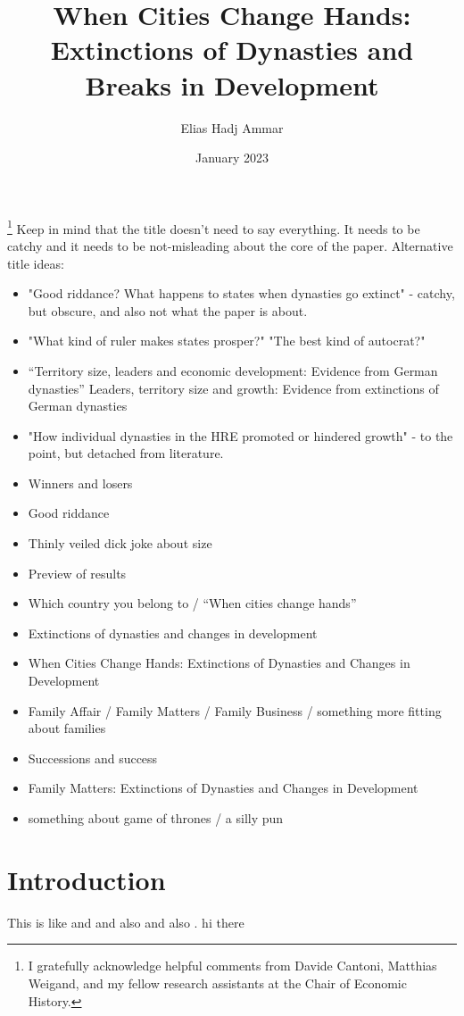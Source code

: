 \documentclass{article}
\title{When Cities Change Hands: Extinctions of Dynasties and \\Breaks in Development}
\author{Elias Hadj Ammar}
\date{January 2023}
\begin{document}
\maketitle
\footnote{I gratefully acknowledge helpful comments from Davide Cantoni, Matthias Weigand, and my fellow research assistants at the Chair of Economic History.}
Keep in mind that the title doesn't need to say everything. It needs to be catchy and it needs to be not-misleading about the core of the paper.
Alternative title ideas: 
\begin{itemize}
    \item "Good riddance? What happens to states when dynasties go extinct" - catchy, but obscure, and also not what the paper is about.
    \item "What kind of ruler makes states prosper?" "The best kind of autocrat?"
    \item ``Territory size, leaders and economic development: Evidence from German dynasties'' {Leaders, territory size and growth: Evidence from extinctions of German dynasties}

    \item "How individual dynasties in the HRE promoted or hindered growth" - to the point, but detached from literature.
    \item Winners and losers
    \item Good riddance
    \item Thinly veiled dick joke about size
    \item Preview of results
    \item Which country you belong to / ``When cities change hands''
    \item {Extinctions of dynasties and changes in development}
    \item {When Cities Change Hands: Extinctions of Dynasties and Changes in Development}
    \item Family Affair / Family Matters / Family Business / something more fitting about families
    \item Successions and success
    \item {Family Matters: Extinctions of Dynasties and Changes in Development}
    \item something about game of thrones / a silly pun
\end{itemize}

\newpage

\setcounter{page}{1}
 
\section{Introduction}

This is like \cite{as1997} and \cite{aw1998} and also \cite{as1997} and also \cite{olken2005}. hi there \cite{olken2005}

\newpage


\end{document}
